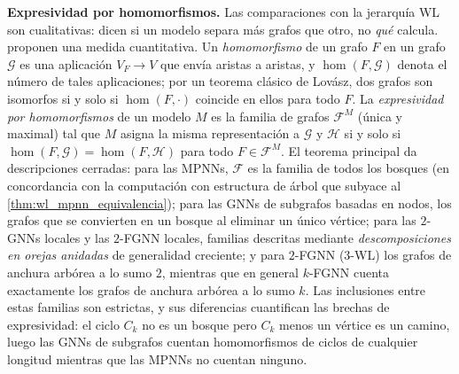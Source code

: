 \textbf{Expresividad por homomorfismos.} Las comparaciones con la jerarquía WL son cualitativas: dicen si un modelo separa más grafos que otro, no \textit{qué} calcula. \citet{zhang2024beyondwl} proponen una medida cuantitativa. Un \textit{homomorfismo} de un grafo $F$ en un grafo $\mathcal{G}$ es una aplicación $V_F \to V$ que envía aristas a aristas, y $\hom(F, \mathcal{G})$ denota el número de tales aplicaciones; por un teorema clásico de Lovász, dos grafos son isomorfos si y solo si $\hom(F, \cdot)$ coincide en ellos para todo $F$. La \textit{expresividad por homomorfismos} de un modelo $M$ es la familia de grafos $\mathcal{F}^M$ (única y maximal) tal que $M$ asigna la misma representación a $\mathcal{G}$ y $\mathcal{H}$ si y solo si $\hom(F, \mathcal{G}) = \hom(F, \mathcal{H})$ para todo $F \in \mathcal{F}^M$. El teorema principal da descripciones cerradas: para las \glspl{MPNN}, $\mathcal{F}$ es la familia de todos los bosques (en concordancia con la computación con estructura de árbol que subyace al \autoref{thm:wl_mpnn_equivalencia}); para las \glspl{GNN} de subgrafos basadas en nodos, los grafos que se convierten en un bosque al eliminar un único vértice; para las $2$-\glspl{GNN} locales y las $2$-FGNN locales, familias descritas mediante \textit{descomposiciones en orejas anidadas} de generalidad creciente; y para $2$-FGNN (3-WL) los grafos de anchura arbórea a lo sumo $2$, mientras que en general $k$-FGNN cuenta exactamente los grafos de anchura arbórea a lo sumo $k$. Las inclusiones entre estas familias son estrictas, y sus diferencias cuantifican las brechas de expresividad: el ciclo $C_k$ no es un bosque pero $C_k$ menos un vértice es un camino, luego las \glspl{GNN} de subgrafos cuentan homomorfismos de ciclos de cualquier longitud mientras que las \glspl{MPNN} no cuentan ninguno.

